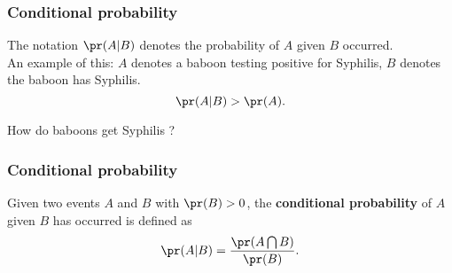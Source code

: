\begin{frame}[fragile]\frametitle{Conditional probability}

The notation $\pr(A|B)$ denotes the probability of $A$ given $B$
occurred. \\ 

An example of this: $A$ denotes a baboon testing positive 
for Syphilis, $B$ denotes the baboon has Syphilis. \\ 
$$\pr(A|B) > \pr(A).$$ 

\vspace{.2in}
How do baboons get Syphilis ?
\end{frame}

\begin{frame}[fragile]\frametitle{Conditional probability}

\begin{defn}

Given two events $A$ and $B$ with $\pr(B) > 0$, the
{\bf conditional probability} of $A$ given $B$ has
occurred is defined as
$$\pr(A|B) = \frac{\pr(A \bigcap B)}{\pr(B)}.$$
\end{defn}

\end{frame}



